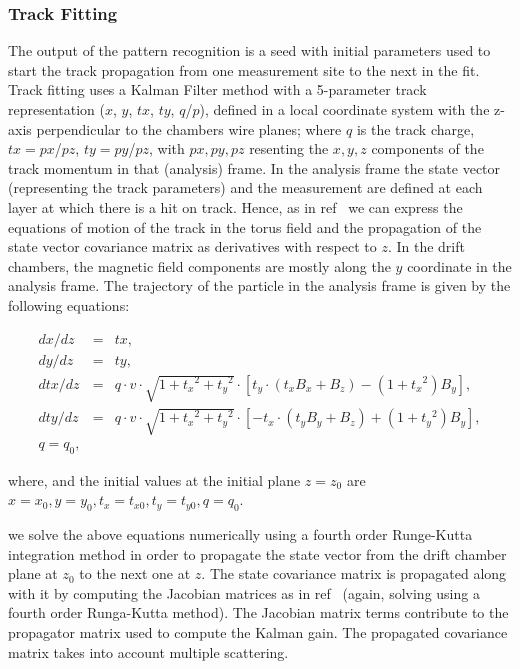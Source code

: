 \documentclass[3p,times,twocolumn]{elsarticle}
\begin{document}
\subsubsection{Track Fitting}
The output of the pattern recognition
is a seed with initial parameters used to start the track propagation from one measurement site to the next in the fit.
Track fitting uses a Kalman Filter method with a 5-parameter track representation ($x$, $y$, $tx$, $ty$, $q$/$p$), defined
in a local coordinate system with the z-axis perpendicular to the chambers wire planes; where $q$ is the
track charge, $tx=px$/$pz$,
$ty=py$/$pz$, with $px,py,pz$ resenting the $x,y,z$ components of the track momentum in that (analysis) frame.
In the analysis frame the state vector (representing the track parameters) and the measurement are defined at each layer
at which there is a hit on track.
Hence, as in ref~\cite{spiri} we can express the equations of motion of the track in the torus field
and the propagation of the state vector covariance matrix as derivatives with respect to $z$.
In the drift chambers, the magnetic field components are mostly along the $y$ coordinate in the analysis frame.
The trajectory of the particle in the analysis frame is given by the following equations:

\begin{eqnarray*}
dx/dz  &=& tx, \\
dy/dz  &=&  ty, \\
dtx/dz &=& q \cdot v \cdot \sqrt{1 + {t_x}^2 + {t_y}^2}\cdot [t_y\cdot (t_x B_x + B_z) - (1 + {t_x}^2 ) B_y], \\
dty/dz  &=&  q \cdot v \cdot \sqrt{1 + {t_x}^2 + {t_y}^2}\cdot [-t_x\cdot (t_y B_y + B_z) + (1 + {t_y}^2 ) B_y], \\
q  =  q_0,
\end{eqnarray*}


where, and the initial values at the initial plane $z = z_{0}$ are
$x = x_{0}, y = y_{0}, t_x = t_{x0}, t_y = t_{y0}, q = q_{0}$.

we solve the above equations
numerically using a fourth order Runge-Kutta integration method in order to propagate the state vector from
the drift chamber plane at $z_{0}$ to the next one at $z$.  The state covariance matrix is propagated along with it
by computing the Jacobian matrices as in ref~\cite{spiri} (again, solving using a fourth order Runga-Kutta method).
The Jacobian matrix terms contribute to the propagator matrix used to compute the Kalman gain.
The propagated covariance matrix takes into account multiple scattering.
\end{document}

